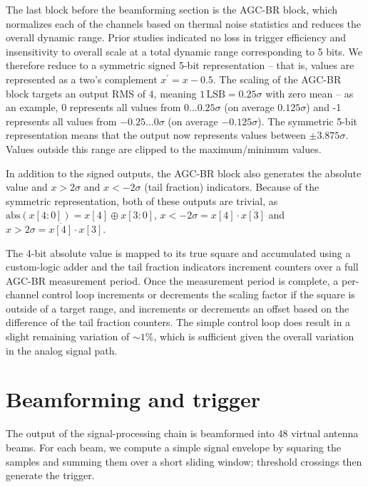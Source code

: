 \documentclass{IEEEtran}
\begin{document}
The last block before the beamforming section is the AGC-BR block,
which normalizes each of the channels based on thermal noise
statistics and reduces the overall dynamic range. Prior studies
\cite{xie2021improving} indicated no loss in trigger efficiency and
insensitivity to overall scale at a total dynamic range corresponding
to 5 bits. We therefore reduce to a symmetric signed 5-bit representation 
-- that is, values are represented as a two's complement $x^{\prime}=x-0.5$. 
The scaling of the AGC-BR block targets an output RMS of $4$, meaning 
$1\,\text{LSB}=0.25\sigma$ with zero mean -- as an example, 0 represents all
values from $0\dots0.25\sigma$ (on average $0.125\sigma$) and -1 represents all 
values from $-0.25\dots0\sigma$ (on average $-0.125\sigma$). The symmetric 5-bit
representation means that the output now represents values between $\pm3.875\sigma$.
Values outside this range are clipped to the maximum/minimum values.

In addition to the signed outputs, the AGC-BR block also generates
the absolute value and $x>2\sigma$ and $x<-2\sigma$ (tail fraction)
indicators. Because of the symmetric representation, both of these
outputs are trivial, as
$\text{abs}\left(x\left[4:0\right]\right)=x\left[4\right]\oplus x\left[3:0\right]$,
$x<-2\sigma =x\left[4\right]\cdot \overline{x\left[3\right]}$ and
$x>2\sigma = \overline{x\left[4\right]} \cdot x\left[3\right]$.

The 4-bit absolute value is mapped to its true square and
accumulated using a custom-logic adder and the tail fraction
indicators increment counters over a full AGC-BR measurement period.
Once the measurement period is complete, a per-channel control loop
increments or decrements the scaling factor if the square is outside of a
target range, and increments or decrements an offset based on the
difference of the tail fraction counters. The simple control loop
does result in a slight remaining variation of $\sim1\%$, which is
sufficient given the overall variation in the analog signal path.

\section{Beamforming and trigger}

The output of the signal-processing chain is beamformed into 48 virtual antenna 
beams. For each beam, we compute a simple signal envelope by squaring the samples
and summing them over a short sliding window; threshold crossings then generate
the trigger.
\end{document}

